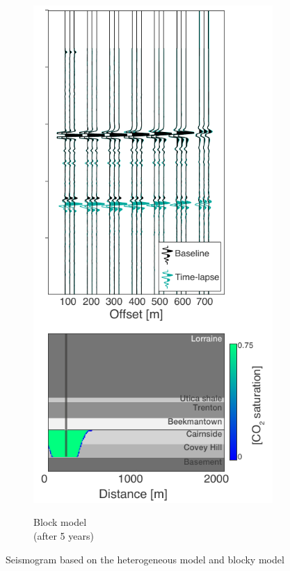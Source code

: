 \begin{figure}[!ht]
\begin{subfigure}[b]{.5\textwidth}
                \label{fig:stochvsblock_a}
        \end{subfigure}%
        \begin{subfigure}[b]{.5\textwidth}
                \caption{Block model \\ (after 5 years)}
                \includegraphics[width=\textwidth]{fig/stochvsblock_b.pdf}
                \label{fig:stochvsblock_b}
        \end{subfigure}
        \caption{Seismogram based on the heterogeneous model and blocky model}
        \label{fig:stochvsblock}
\end{figure}
